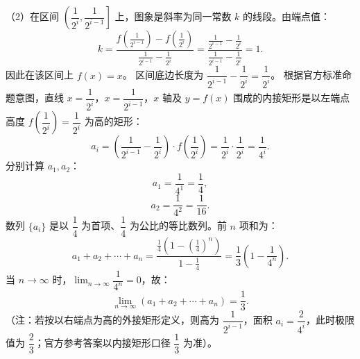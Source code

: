\begin{answer}
（2）在区间 $\left(\dfrac{1}{2^i}, \dfrac{1}{2^{i-1}}\right]$ 上，图象是斜率为同一常数 $k$ 的线段。由端点值：
\nopagebreak[4]
\[
k=\frac{f\left(\frac{1}{2^{i-1}}\right)-f\left(\frac{1}{2^i}\right)}{\frac{1}{2^{i-1}}-\frac{1}{2^i}}=\frac{\frac{1}{2^{i-1}}-\frac{1}{2^i}}{\frac{1}{2^{i-1}}-\frac{1}{2^i}}=1.
\]
因此在该区间上 $f(x)=x$。
区间底边长度为 $\dfrac{1}{2^{i-1}}-\dfrac{1}{2^i}=\dfrac{1}{2^i}$。
根据官方标准命题意图，直线 $x=\dfrac{1}{2^i}$，$x=\dfrac{1}{2^{i-1}}$，$x$ 轴及 $y=f(x)$ 围成的内接矩形是以左端点高度 $f\left(\dfrac{1}{2^i}\right)=\dfrac{1}{2^i}$ 为高的矩形：
\nopagebreak[4]
\[
a_i=\left(\frac{1}{2^{i-1}}-\frac{1}{2^i}\right)\cdot f\left(\frac{1}{2^i}\right)=\frac{1}{2^i}\cdot\frac{1}{2^i}=\frac{1}{4^i}.
\]
分别计算 $a_1, a_2$：
\nopagebreak[4]
\[
a_1=\frac{1}{4^1}=\frac{1}{4},
\]
\nopagebreak[4]
\[
a_2=\frac{1}{4^2}=\frac{1}{16}.
\]
数列 $\{a_i\}$ 是以 $\dfrac{1}{4}$ 为首项、$\dfrac{1}{4}$ 为公比的等比数列。前 $n$ 项和为：
\nopagebreak[4]
\[
a_1+a_2+\cdots+a_n=\frac{\frac{1}{4}\left(1-\left(\frac{1}{4}\right)^n\right)}{1-\frac{1}{4}}=\frac{1}{3}\left(1-\frac{1}{4^n}\right).
\]
当 $n\to\infty$ 时，$\lim_{n\to\infty}\dfrac{1}{4^n}=0$，故：
\nopagebreak[4]
\[
\lim_{n\to\infty}(a_1+a_2+\cdots+a_n)=\frac{1}{3}.
\]
（注：若按以右端点为高的外接矩形定义，则高为 $\dfrac{1}{2^{i-1}}$，面积 $a_i=\dfrac{2}{4^i}$，此时极限值为 $\dfrac{2}{3}$；官方参考答案以内接矩形口径 $\dfrac{1}{3}$ 为准）。


\end{answer}
